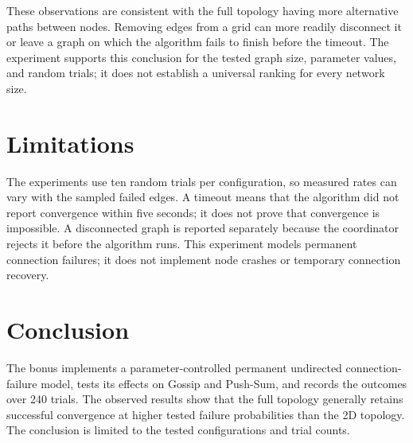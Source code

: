 \documentclass[11pt]{article}
\begin{document}
These observations are consistent with the full topology having more
alternative paths between nodes. Removing edges from a grid can more
readily disconnect it or leave a graph on which the algorithm fails to
finish before the timeout. The experiment supports this conclusion for
the tested graph size, parameter values, and random trials; it does
not establish a universal ranking for every network size.

\section{Limitations}
The experiments use ten random trials per configuration, so measured
rates can vary with the sampled failed edges. A timeout means that
the algorithm did not report convergence within five seconds; it does
not prove that convergence is impossible. A disconnected graph is
reported separately because the coordinator rejects it before the
algorithm runs. This experiment models permanent connection failures;
it does not implement node crashes or temporary connection recovery.

\section{Conclusion}
The bonus implements a parameter-controlled permanent undirected
connection-failure model, tests its effects on Gossip and Push-Sum,
and records the outcomes over 240 trials. The observed results show
that the full topology generally retains successful convergence at
higher tested failure probabilities than the 2D topology. The
conclusion is limited to the tested configurations and trial counts.
\end{document}
